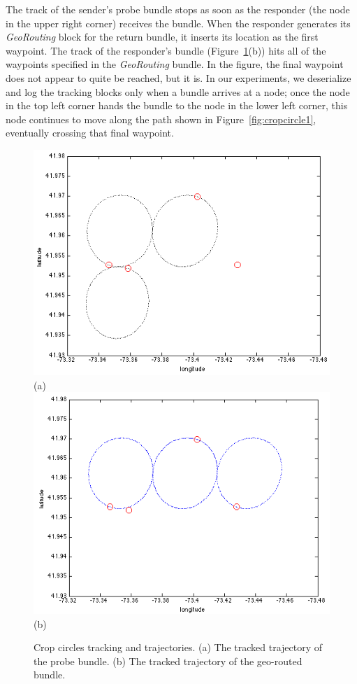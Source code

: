 The track of the sender's probe bundle stops as soon as the responder
(the node in the upper right corner) receives the bundle. When the
responder generates its {\em GeoRouting} block for the return bundle,
it inserts its location as the first waypoint. The track of the
responder's bundle (Figure~\ref{fig:cropCirclesExperiment}(b)) hits
all of the waypoints specified in the {\em GeoRouting} bundle. In the
figure, the final waypoint does not appear to quite be reached, but it
is. In our experiments, we deserialize and log the tracking blocks
only when a bundle arrives at a node; once the node in the top left
corner hands the bundle to the node in the lower left corner, this
node continues to move along the path shown in
Figure~\ref{fig:cropcircle1}, eventually crossing that final waypoint.
\begin{figure}
\begin{center}
\includegraphics[width=.8\columnwidth]{figures/cropCirclesExperiment2.png}\\
(a)\\
\includegraphics[width=.8\columnwidth]{figures/cropCirclesExperiment.png}\\
(b)\\
\end{center}
\vspace{-.5cm}
\caption{Crop circles tracking and trajectories. (a) The tracked
  trajectory of the probe bundle. (b) The tracked trajectory of the
  geo-routed bundle.}
\label{fig:cropCirclesExperiment}
\vspace{-.5cm}
\end{figure}



